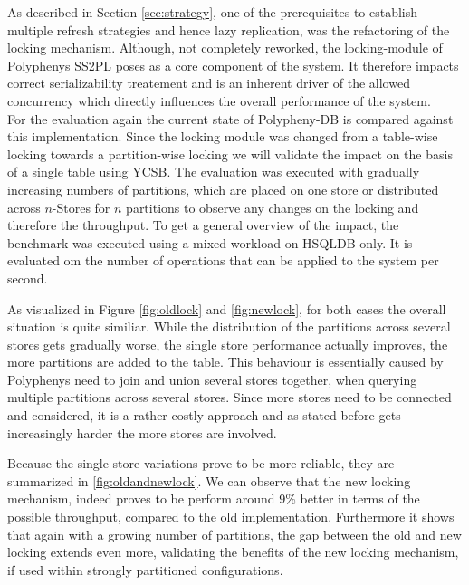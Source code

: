 As described in Section \ref{sec:strategy}, one of the prerequisites to establish multiple refresh strategies and hence lazy replication,  
was the refactoring of the locking mechanism. Although, not completely reworked, the locking-module of Polyphenys SS2PL 
poses as a core component of the system. It therefore impacts correct serializability treatement and is an inherent driver of 
the allowed concurrency which directly influences the overall performance of the system.\\
For the evaluation again the current state of Polypheny-DB is compared against this implementation.
Since the locking module was changed from a table-wise locking towards a partition-wise locking we will validate the impact on the basis of 
a single table using YCSB. 
The evaluation was executed with gradually increasing numbers of partitions, which are placed on one store or distributed across $n$-Stores 
for $n$ partitions to observe any changes on the locking and therefore the throughput.
To get a general overview of the impact, the benchmark was executed using a mixed workload on HSQLDB only.
It is evaluated om the number of operations that can be applied to the system per second.




As visualized in Figure \ref{fig:oldlock} and \ref{fig:newlock}, for both cases the overall situation is quite similiar.
While the distribution of the partitions across several stores gets gradually worse, the single store performance actually improves, the more partitions are added to the table.
This behaviour is essentially caused by Polyphenys need to join and union several stores together, when querying multiple partitions across several stores.
Since more stores need to be connected and considered, it is a rather costly approach and as stated before gets increasingly harder the more stores are involved.

Because the single store variations prove to be more reliable, they are summarized in \ref{fig:oldandnewlock}.
We can observe that the new locking mechanism, indeed proves to be perform around 9\% better in terms of the possible throughput, compared to the old implementation.
Furthermore it shows that again with a growing number of partitions, the gap between the old and new locking extends even more, 
validating the benefits of the new locking mechanism, if used within strongly partitioned configurations.






